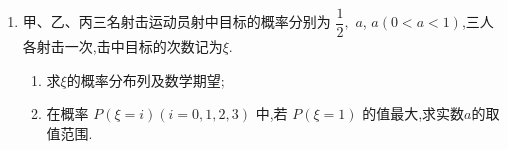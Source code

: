 \begin{enumerate}
\begin{jieda}
\begin{enumerate}
    \item  $\eta$ 的分布列为 $P\left( {\eta  = k}\right)  = P$ (前 $k$ 个是绿灯,第 $k + 1$ 个是红灯)
$= {\left( \dfrac{2}{3}\right) }^{k} \cdot  \dfrac{1}{3},k = 0,1,2,3,4,$
即 $P\left( {\eta  = 0}\right)  = {\left( \dfrac{2}{3}\right) }^{0} \times  \dfrac{1}{3} = \dfrac{1}{3}$ ;
$P\left( {\eta  = 1}\right)  = \dfrac{2}{3} \times  \dfrac{1}{3} = \dfrac{2}{9};$
$P\left( {\eta  = 2}\right)  = {\left( \dfrac{2}{3}\right) }^{2} \times  \dfrac{1}{3} = \dfrac{4}{27};$
$P\left( {\eta  = 3}\right)  = {\left( \dfrac{2}{3}\right) }^{3} \times  \dfrac{1}{3} = \dfrac{8}{81};$
$P\left( {\eta  = 4}\right)  = {\left( \dfrac{2}{3}\right) }^{4} \times  \dfrac{1}{3} = \dfrac{16}{243};$
$P\left( {\eta  = 5}\right)  = P\left( {5\text{ 个均为绿灯 }}\right)  = {\left( \dfrac{2}{3}\right) }^{5}$
$= \dfrac{32}{243}$ .
故 $\eta$ 的分布列为
$\begin{pmatrix}
   0 & 1&  2& 3 & 4& 5\\
   \dfrac{1}{3}&\dfrac{2}{9}&\dfrac{4}{27}&\dfrac{8}{81}&\dfrac{16}{243}&\dfrac{32}{243}
\end{pmatrix}$
    
    \item 所求概率为 $P\left( {\xi  \geq  1}\right)  = 1 - P\left( {\xi  = 0}\right)$
$= 1 - {\left( \dfrac{2}{3}\right) }^{5} = \dfrac{211}{243}$ .
    \end{enumerate}
\end{jieda}



\item 甲、乙、丙三名射击运动员射中目标的概率分别为 $\dfrac{1}{2},$ $a$, $a(0<a<1)$,三人各射击一次,击中目标的次数记为$\xi$.
\begin{enumerate}
\item 求$\xi$的概率分布列及数学期望;
\item 在概率 $P(\xi=i)(i=0,1,2,3)$ 中,若 $P(\xi=1)$ 的值最大,求实数$a$的取值范围.
\end{enumerate}


\end{enumerate}
